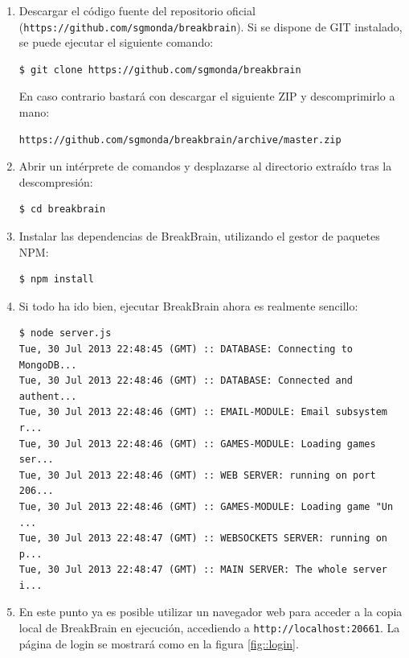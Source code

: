 \begin{enumerate}
\item Descargar el código fuente del repositorio oficial ({\tt https://github.com/sgmonda/breakbrain}). Si se dispone de GIT instalado, se puede ejecutar el siguiente comando:

\begin{verbatim}
$ git clone https://github.com/sgmonda/breakbrain
\end{verbatim}

En caso contrario bastará con descargar el siguiente ZIP y descomprimirlo a mano:

\begin{verbatim}
https://github.com/sgmonda/breakbrain/archive/master.zip
\end{verbatim}

\item Abrir un intérprete de comandos y desplazarse al directorio extraído tras la descompresión:

\begin{verbatim}
$ cd breakbrain
\end{verbatim}

\item Instalar las dependencias de BreakBrain, utilizando el gestor de paquetes NPM:
\begin{verbatim}
$ npm install
\end{verbatim}

\item Si todo ha ido bien, ejecutar BreakBrain ahora es realmente sencillo:
\begin{verbatim}
$ node server.js
Tue, 30 Jul 2013 22:48:45 (GMT) :: DATABASE: Connecting to MongoDB...
Tue, 30 Jul 2013 22:48:46 (GMT) :: DATABASE: Connected and authent...
Tue, 30 Jul 2013 22:48:46 (GMT) :: EMAIL-MODULE: Email subsystem r...
Tue, 30 Jul 2013 22:48:46 (GMT) :: GAMES-MODULE: Loading games ser...
Tue, 30 Jul 2013 22:48:46 (GMT) :: WEB SERVER: running on port 206...
Tue, 30 Jul 2013 22:48:46 (GMT) :: GAMES-MODULE: Loading game "Un ...
Tue, 30 Jul 2013 22:48:47 (GMT) :: WEBSOCKETS SERVER: running on p...
Tue, 30 Jul 2013 22:48:47 (GMT) :: MAIN SERVER: The whole server i...
\end{verbatim}

\item En este punto ya es posible utilizar un navegador web para acceder a la copia local de BreakBrain en ejecución, accediendo a {\tt http://localhost:20661}. La página de login se mostrará como en la figura \ref{fig::login}.


\end{enumerate}
